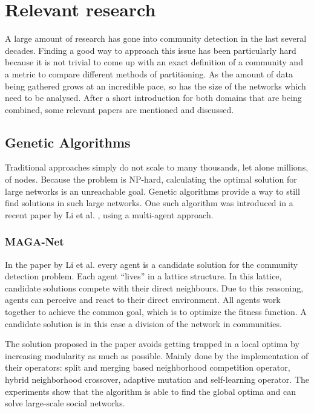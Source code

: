 \section{Relevant research}
\label{sec:relevantResearch}
A large amount of research has gone into community detection in the last several decades. 
Finding a good way to approach this issue has been particularly hard because it is not trivial to come up with an exact definition of a community and a metric to compare different methods of partitioning. 
As the amount of data being gathered grows at an incredible pace, so has the size of the networks which need to be analysed. 
After a short introduction for both domains that are being combined, some relevant papers are mentioned and discussed. \\

\subsection{Genetic Algorithms}
Traditional approaches simply do not scale to many thousands, let alone millions, of nodes. 
Because the problem is NP-hard, calculating the optimal solution for large networks is an unreachable goal.
Genetic algorithms provide a way to still find solutions in such large networks. 
One such algorithm was introduced in a recent paper by Li et al. \cite{multiagent2016}, using a multi-agent approach. 


\subsubsection{MAGA-Net}
In the paper by Li et al. \cite{multiagent2016} every agent is a candidate solution for the community detection problem.
Each agent ``lives'' in a lattice structure. 
In this lattice, candidate solutions compete with their direct neighbours.
Due to this reasoning, agents can perceive and react to their direct environment.
All agents work together to achieve the common goal, which is to optimize the fitness function.
A candidate solution is in this case a division of the network in communities.

The solution proposed in the paper avoids getting trapped in a local optima by increasing modularity as much as possible.
Mainly done by the implementation of their operators: split and merging based neighborhood competition operator, hybrid neighborhood crossover, adaptive mutation and self-learning operator.
The experiments show that the algorithm is able to find the global optima and can solve large-scale social networks.

